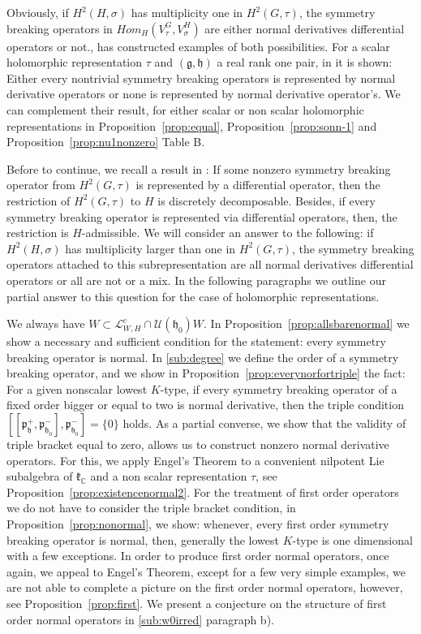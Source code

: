 \documentclass[12pt]{amsart}
\theoremstyle{definition}
\theoremstyle{remark}
\newcommand{\g}{\mathfrak{g}}
\newcommand{\h}{\mathfrak{h}}
\renewcommand{\k}{{\mathfrak k}}
\newcommand{\p}{\mathfrak p}
\newcommand{\C}{{\mathbb C}}
\numberwithin{equation}{section}
\begin{document}
  Obviously,  if  $H^2(H,\sigma)$ has multiplicity one in $H^2(G,\tau)$, the symmetry breaking operators in $Hom_H(V_\tau^G,V_\sigma^H)$ are either normal derivatives differential operators or not.\cite{KP1}, \cite{KP2} has constructed examples of both possibilities. For a scalar holomorphic  representation $\tau$ and $(\g,\h)$ a real rank one pair,  in \cite[Theorem 5.3]{KP2} it is shown: Either every   nontrivial symmetry breaking operators is represented by normal derivative operators or none is represented by normal derivative operator's. We can complement  their result, for either scalar or non scalar holomorphic representations in Proposition~\ref{prop:equal},  Proposition~\ref{prop:sonn-1} and  Proposition~\ref{prop:nu1nonzero} Table B.

 Before to continue, we recall a result in \cite{OV2}: If some nonzero symmetry breaking operator from $H^2(G,\tau)$ is represented by a differential operator, then the restriction   of $H^2(G,\tau)$ to $H$ is discretely decomposable. Besides, if every symmetry breaking operator is represented via differential operators, then, the restriction is $H$-admissible.  We will consider  an answer to the following:  if   $H^2(H,\sigma)$ has multiplicity  larger than one  in $H^2(G,\tau)$, the symmetry breaking operators attached to this subrepresentation are all  normal derivatives differential operators or all are not or a mix. In the following paragraphs we outline  our partial answer to this question for the case of holomorphic representations.


We always have $ W \subset \mathcal L_{W,H}^c \cap \mathcal U(\h_0)W $. In Proposition~\ref{prop:allsbarenormal} we show a necessary and sufficient condition for the statement: every symmetry breaking operator is normal.   In \ref{sub:degree}  we define the order of a symmetry breaking operator, and we show in Proposition~\ref{prop:everynorfortriple} the fact: For a given nonscalar lowest $K$-type,   if every symmetry breaking operator of a fixed order bigger or equal to two is normal derivative, then the triple condition $[[\p_\h^+, \p_{\h_0}^-], \p_{\h_0}^-]=\{0\}$ holds. As a partial converse, we show that the validity of triple bracket equal to zero,  allows us to construct nonzero normal derivative operators. For this, we apply Engel's Theorem to a convenient nilpotent Lie subalgebra of $\k_\C$ and a non scalar representation $\tau$, see Proposition~\ref{prop:existencenormal2}.
For the treatment of first order operators we do not have  to consider  the triple bracket condition, in Proposition~\ref{prop:nonormal}, we show: whenever,    every first order symmetry breaking operator is normal, then, generally the lowest $K$-type is one dimensional with a few exceptions. In order to produce first order normal operators, once again, we appeal to Engel's Theorem, except  for a few very simple examples, we are not able to complete a picture on the first order normal operators, however, see Proposition~\ref{prop:first}. We present a conjecture on the structure of first order normal operators   in \ref{sub:w0irred} paragraph b).
\end{document}
